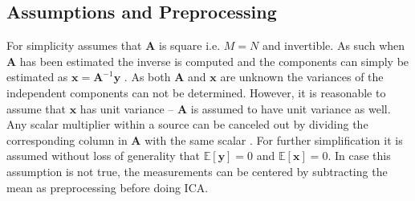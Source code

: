 \subsection{Assumptions and Preprocessing}
For simplicity assumes that $\mathbf{A}$ is square i.e. $M = N$ and invertible. 
As such when $\mathbf{A}$ has been estimated the inverse is computed and the components can simply be estimated as $\mathbf{x} = \mathbf{A}^{-1} \mathbf{y}$ \cite[p. 152-153]{ICA}.
As both $\mathbf{A}$ and $\mathbf{x}$ are unknown the variances of the independent components can not be determined. 
However, it is reasonable to assume that $\mathbf{x}$ has unit variance -- $\mathbf{A}$ is assumed to have unit variance as well. 
Any scalar multiplier within a source can be canceled out by dividing the corresponding column in $\mathbf{A}$ with the same scalar \cite[p. 154]{ICA}.
For further simplification it is assumed without loss of generality that $\mathbb{E}[\mathbf{y}] = 0$ and $\mathbb{E}[\mathbf{x}] = 0$\cite[p. 154]{ICA}. 
In case this assumption is not true, the measurements can be centered by subtracting the mean as preprocessing before doing ICA.

